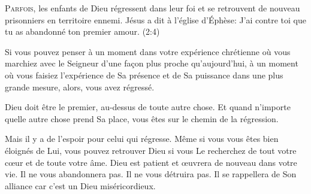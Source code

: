 

\lettrine{P}{arfois,} les enfants de Dieu régressent dans leur foi
 et se retrouvent de nouveau prisonniers en territoire ennemi.
 Jésus a dit à l'église d'Éphèse:
 \Og J'ai contre toi que tu as abandonné ton premier amour. \Fg{}
 (2:4)

Si vous pouvez penser à un moment dans votre expérience chrétienne
 où vous marchiez avec le Seigneur d'une fa\c{c}on plus proche qu'aujourd'hui,
 à un moment où vous faisiez l'expérience de Sa présence et de Sa puissance
 dans une plus grande mesure, alors, vous avez régressé.


Dieu doit être le premier, au-dessus de toute autre chose.
 Et quand n'importe quelle autre chose prend Sa place,
 vous êtes sur le chemin de la régression.

Mais il y a de l'espoir pour celui qui régresse.
 Même si vous vous êtes bien éloignés de Lui, vous pouvez retrouver Dieu
 si vous Le recherchez de tout votre c\oe{}ur et de toute votre âme.
 Dieu est patient et \oe{}uvrera de nouveau dans votre vie.
 Il ne vous abandonnera pas. Il ne vous détruira pas.
 Il se rappellera de Son alliance car c'est un Dieu miséricordieux. 

\dvrule







